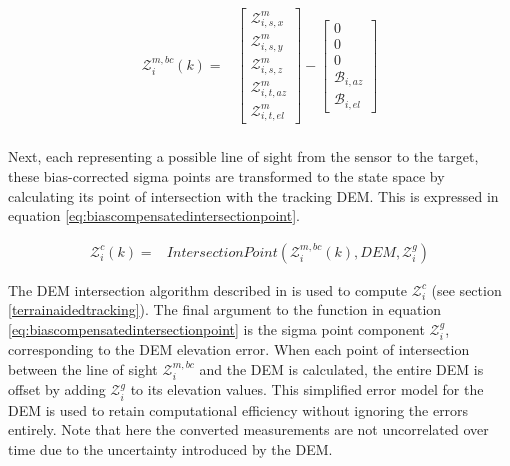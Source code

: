 \documentclass[journal]{IEEEtran}
\begin{document}
\begin{equation}
\begin{aligned}
    \mathcal{Z}_i^{m,bc}(k) ={}& \begin{bmatrix}
            \mathcal{Z}_{i,s,x}^m \\
            \mathcal{Z}_{i,s,y}^m \\
            \mathcal{Z}_{i,s,z}^m \\
            \mathcal{Z}_{i,t,az}^m \\
            \mathcal{Z}_{i,t,el}^m
        \end{bmatrix} - \begin{bmatrix}
            0 \\
            0 \\
            0 \\
            \mathcal{B}_{i,az} \\
            \mathcal{B}_{i,el}
        \end{bmatrix}\\
\end{aligned} \label{eq:biascompensationsigma}
\end{equation}

Next, each representing a possible line of sight from the sensor to the target, these bias-corrected sigma points are transformed to the state space by calculating its point of intersection with the tracking DEM. This is expressed in equation \ref{eq:biascompensatedintersectionpoint}.

\begin{equation}
\begin{aligned}
    \mathcal{Z}_i^{c}(k) ={}& IntersectionPoint(\mathcal{Z}_i^{m,bc}(k), DEM, \mathcal{Z}_i^g)
\end{aligned} \label{eq:biascompensatedintersectionpoint}
\end{equation}

The DEM intersection algorithm described in \cite{schonborn2022terrain} is used to compute $\mathcal{Z}_i^{c}$ (see section \ref{terrainaidedtracking}). The final argument to the function in equation \ref{eq:biascompensatedintersectionpoint} is the sigma point component $\mathcal{Z}_i^g$, corresponding to the DEM elevation error. When each point of intersection between the line of sight $\mathcal{Z}_i^{m,bc}$ and the DEM is calculated, the entire DEM is offset by adding $\mathcal{Z}_i^g$ to its elevation values. This simplified error model for the DEM is used to retain computational efficiency without ignoring the errors entirely. Note that here the converted measurements are not uncorrelated over time due to the uncertainty introduced by the DEM.
\end{document}
